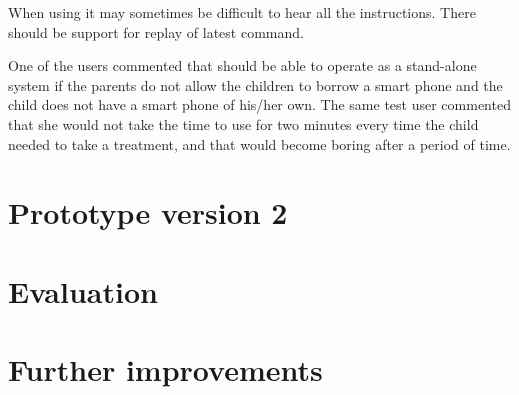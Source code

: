 When using \ab{} it may sometimes be difficult to hear all the instructions. There should be support for replay of latest command.

One of the users commented that \ab{} should be able to operate as a stand-alone system if the parents do not allow the children to borrow a smart phone and the child does not have a smart phone of his/her own. The same test user commented that she would not take the time to use \ab{} for two minutes every time the child needed to take a treatment, and that \ab{} would become boring after a period of time. 


	
\section{Prototype version 2}


\section{Evaluation}



\section{Further improvements}

 
